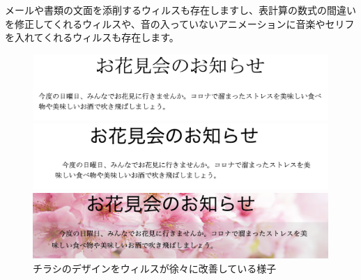 \documentclass[12pt, unicode]{beamer}
\begin{document}
\begin{frame}

メールや書類の文面を添削するウィルスも存在しますし、表計算の数式の間違いを修正してくれるウィルスや、音の入っていないアニメーションに音楽やセリフを入れてくれるウィルスも存在します。

\begin{figure}[htbp]
  \begin{minipage}[b]{0.2\linewidth}
    \includegraphics[keepaspectratio, scale=0.1]{pic4.png}
  \end{minipage}
  \begin{minipage}[b]{0.1\linewidth}
  \end{minipage}
  \begin{minipage}[b]{0.2\linewidth}
    \includegraphics[keepaspectratio, scale=0.1]{pic5.png}
  \end{minipage}
  \begin{minipage}[b]{0.1\linewidth}
  \end{minipage}
  \begin{minipage}[b]{0.2\linewidth}
    \includegraphics[keepaspectratio, scale=0.1]{pic6.png}
  \end{minipage}
  \caption{チラシのデザインをウィルスが徐々に改善している様子}
\end{figure}



\end{frame}
\end{document}
